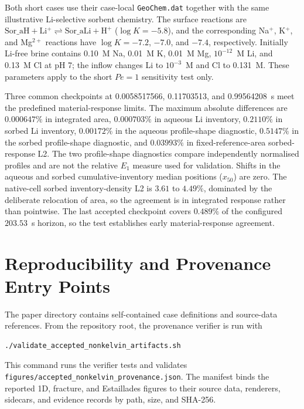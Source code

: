 \documentclass[pdflatex,sn-basic]{sn-jnl}
\begin{document}
Both short cases use their case-local \texttt{GeoChem.dat} together with the
same illustrative Li-selective sorbent chemistry. The surface reactions are
$\mathrm{Sor\_aH}+\mathrm{Li^+}\rightleftharpoons\mathrm{Sor\_aLi}+\mathrm{H^+}$
($\log K=-5.8$), and the corresponding Na$^+$, K$^+$, and Mg$^{2+}$ reactions
have $\log K=-7.2$, $-7.0$, and $-7.4$, respectively. Initially Li-free brine
contains 0.10~M Na, 0.01~M K, 0.01~M Mg, $10^{-12}$~M Li, and 0.13~M Cl at pH
7; the inflow changes Li to $10^{-3}$~M and Cl to 0.131~M. These parameters
apply to the short $Pe=1$ sensitivity test only.

Three common checkpoints at 0.0058517566, 0.11703513, and 0.99564208~s meet
the predefined material-response limits. The maximum absolute differences
are $0.000647\%$ in integrated area, $0.000703\%$ in aqueous Li inventory,
$0.2110\%$ in sorbed Li inventory, $0.00172\%$ in the aqueous profile-shape
diagnostic, $0.5147\%$ in the sorbed profile-shape diagnostic, and $0.03993\%$
in fixed-reference-area sorbed-response L2. The two profile-shape diagnostics
compare independently normalised profiles and are not the relative $E_1$
measure used for validation. Shifts in the aqueous and sorbed cumulative-inventory median positions
($x_{50}$) are zero. The native-cell
sorbed inventory-density L2 is $3.61$ to $4.49\%$, dominated by the deliberate
relocation of area, so the agreement is in integrated response rather than
pointwise. The last accepted checkpoint covers $0.489\%$ of the configured
$203.53$~s horizon, so the test establishes early material-response agreement.

\section{Reproducibility and Provenance Entry Points}

The paper directory contains self-contained case definitions and source-data
references. From the repository root, the provenance verifier is run with
\begin{verbatim}
./validate_accepted_nonkelvin_artifacts.sh
\end{verbatim}
This command runs the verifier tests and validates
\texttt{figures/accepted\_nonkelvin\_provenance.json}. The manifest binds the
reported 1D, fracture, and Estaillades figures to their source data, renderers,
sidecars, and evidence records by path, size, and SHA-256.
\end{document}
